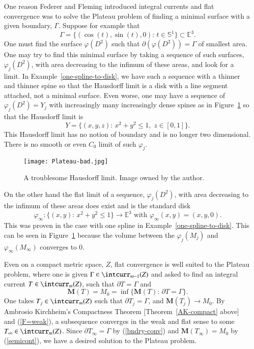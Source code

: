 \documentclass[12pt]{amsart}
\begin{document}
One reason Federer and Fleming introduced integral currents and
flat convergence was to solve the Plateau problem of finding
a minimal surface with a given boundary, $\Gamma$.  Suppose
for example that
\begin{equation}
\Gamma=\{(\cos(t), \sin(t),0): \, t\in \mathbb{S}^1\}\subset{\mathbb{E}}^3. 
\end{equation}
One must find the surface 
$\varphi(D^2)$ such that $\partial(\varphi(D^2))=\Gamma$
of smallest area.   One may try to find this minimal surface by taking
a sequence of such surfaces, $\varphi_j(D^2)$, with area decreasing to
the infimum of these areas, and look for a limit.  In Example~\ref{one-spline-to-disk}, we have such a sequence with a thinner and thinner spine
so that the Hausdorff limit is a disk with a line segment attached,
not a minimal surface.   Even worse, one may
have a sequence of $\varphi_j(D^2)=Y_j$ with increasingly many increasingly dense spines 
as in Figure~\ref{fig-Plateau}
so that the Hausdorff
limit is 
\begin{equation}
Y= \{ (x,y,z): \, x^2+y^2 \le 1, \,\, z\in [0,1]\}.
\end{equation}
  This Hausdorff limit has no notion of boundary and
is no longer two dimensional.  There is no smooth or even $C_0$ limit of
such $\varphi_j$.

\begin{figure}[htbp]
\begin{center}
\texttt{[image: Plateau-bad.jpg]}
\caption{A troublesome Hausdorff limit.  Image owned by the author.}
\label{fig-Plateau}
\end{center}
\end{figure}

On the other hand
the flat limit of a sequence,
$\varphi_j(D^2)$, with area decreasing to
the infimum of these areas does exist and
is the standard disk
\begin{equation}
\varphi_\infty: \{(x,y): \, x^2+y^2 \le 1\} \to {\mathbb{E}}^3
\textrm{ with } \varphi_\infty(x,y)=(x,y,0).
\end{equation}
This was proven in the case with one spline in Example~\ref{one-spline-to-disk}.
This can be seen in Figure~\ref{fig-Plateau} because the volume between the
$\varphi_j(M_j)$ and $\varphi_\infty(M_\infty)$ converges to $0$.  

Even on a compact metric space, $Z$, flat convergence is well suited to
the Plateau problem, where one is given $\Gamma \in \intcurr_{m-1}(Z)$
and asked to find an integral current $T\in \intcurr_m(Z)$, such that
$\partial T = \Gamma$ and
\begin{equation}
{{\mathbf M}}(T) =  M_0=\inf\{{{\mathbf M}}(T): \, \partial T=\Gamma\}.
\end{equation}
One takes $T_j \in \intcurr_m(Z)$ such that $\partial T_j = \Gamma$,
and ${{\mathbf M}}(T_j) \to M_0$.  By Ambrosio Kirchheim's Compactness
Theorem [Theorem~\ref{AK-compact} above] and (\ref{F=weak}), 
a subsequence converges in the weak and flat sense to some
$T_\infty \in \intcurr_m(Z)$.
Since $\partial T_\infty = \Gamma$
by (\ref{bndry-conv}) and ${{\mathbf M}}(T_\infty)=M_0$
by (\ref{semicont}), we have a desired solution to the Plateau problem.
\end{document}

